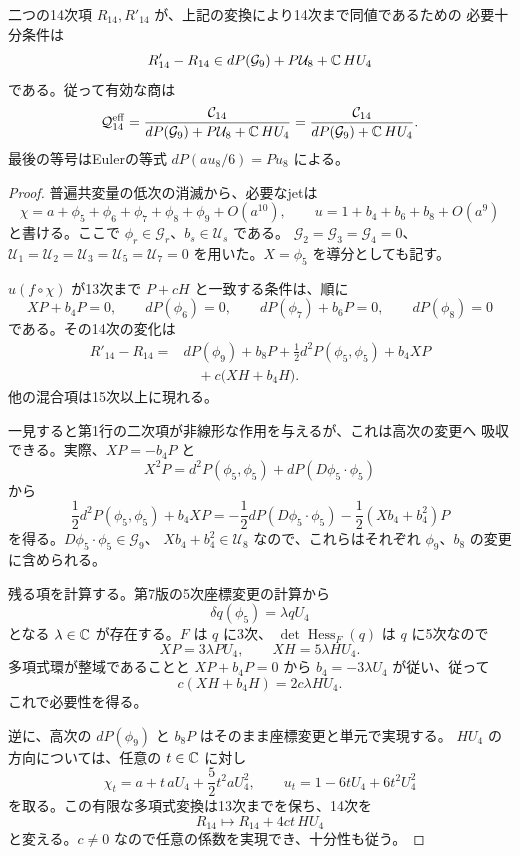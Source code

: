 \begin{proposition}[14次の有効な接触作用]
\label{prop:v11-effective-contact-fourteen}
二つの14次項 $R_{14},R'_{14}$ が、上記の変換により14次まで同値であるための
必要十分条件は
\[
 R'_{14}-R_{14}\in
 dP(\mathcal G_9)+P\mathcal U_8+\mathbb C\,HU_4
\]
である。従って有効な商は
\begin{equation}\label{eq:v11-effective-fourteen-quotient}
 \mathcal Q^{\mathrm{eff}}_{14}
 =\frac{\mathcal C_{14}}
 {dP(\mathcal G_9)+P\mathcal U_8+\mathbb C\,HU_4}
 =\frac{\mathcal C_{14}}
 {dP(\mathcal G_9)+\mathbb C\,HU_4}.
\end{equation}
最後の等号はEulerの等式
$dP(au_8/6)=Pu_8$ による。
\end{proposition}
\begin{proof}
普遍共変量の低次の消滅から、必要なjetは
\[
 \chi=a+\phi_5+\phi_6+\phi_7+\phi_8+\phi_9+O(a^{10}),
 \qquad
 u=1+b_4+b_6+b_8+O(a^9)
\]
と書ける。ここで $\phi_r\in\mathcal G_r$、$b_s\in\mathcal U_s$ である。
$\mathcal G_2=\mathcal G_3=\mathcal G_4=0$、
$\mathcal U_1=\mathcal U_2=\mathcal U_3=\mathcal U_5=\mathcal U_7=0$
を用いた。$X=\phi_5$ を導分としても記す。

$u(f\circ\chi)$ が13次まで $P+cH$ と一致する条件は、順に
\[
 XP+b_4P=0,\qquad dP(\phi_6)=0,\qquad
 dP(\phi_7)+b_6P=0,\qquad dP(\phi_8)=0
\]
である。その14次の変化は
\begin{align*}
 R'_{14}-R_{14}
 ={}&dP(\phi_9)+b_8P
       +\frac12d^2P(\phi_5,\phi_5)+b_4XP\\
   &\quad+c\bigl(XH+b_4H\bigr).
\end{align*}
他の混合項は15次以上に現れる。

一見すると第1行の二次項が非線形な作用を与えるが、これは高次の変更へ
吸収できる。実際、$XP=-b_4P$ と
\[
 X^2P=d^2P(\phi_5,\phi_5)+dP(D\phi_5\cdot\phi_5)
\]
から
\[
 \frac12d^2P(\phi_5,\phi_5)+b_4XP
 =-\frac12dP(D\phi_5\cdot\phi_5)
  -\frac12(Xb_4+b_4^2)P
\]
を得る。$D\phi_5\cdot\phi_5\in\mathcal G_9$、
$Xb_4+b_4^2\in\mathcal U_8$ なので、これらはそれぞれ
$\phi_9$、$b_8$ の変更に含められる。

残る項を計算する。第7版の5次座標変更の計算から
\[
 \delta q(\phi_5)=\lambda qU_4
\]
となる $\lambda\in\mathbb C$ が存在する。$F$ は $q$ に3次、
$\det\operatorname{Hess}_F(q)$ は $q$ に5次なので
\[
 XP=3\lambda PU_4,\qquad XH=5\lambda HU_4.
\]
多項式環が整域であることと $XP+b_4P=0$ から
$b_4=-3\lambda U_4$ が従い、従って
\[
 c(XH+b_4H)=2c\lambda HU_4.
\]
これで必要性を得る。

逆に、高次の $dP(\phi_9)$ と $b_8P$ はそのまま座標変更と単元で実現する。
$HU_4$ の方向については、任意の $t\in\mathbb C$ に対し
\[
 \chi_t=a+t\,aU_4+\frac52t^2aU_4^2,
 \qquad u_t=1-6tU_4+6t^2U_4^2
\]
を取る。この有限な多項式変換は13次までを保ち、14次を
\[
 R_{14}\longmapsto R_{14}+4ct\,HU_4
\]
と変える。$c\ne0$ なので任意の係数を実現でき、十分性も従う。
\end{proof}

